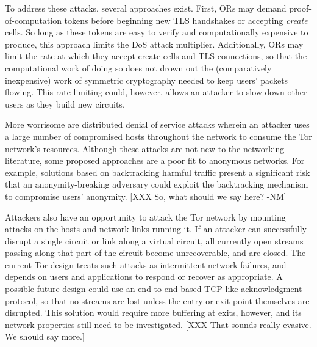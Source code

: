 \documentclass[times,10pt,twocolumn]{article}
\begin{document}
To address these attacks, several approaches exist.  First, ORs may
demand proof-of-computation tokens \cite{hashcash} before beginning new
TLS handshakes or accepting \emph{create} cells.  So long as these
tokens are easy to verify and computationally expensive to produce, this
approach limits the DoS attack multiplier.  Additionally, ORs may limit
the rate at which they accept create cells and TLS connections, so that
the computational work of doing so does not drown out the (comparatively
inexpensive) work of symmetric cryptography needed to keep users'
packets flowing.  This rate limiting could, however, allows an attacker
to slow down other users as they build new circuits.


More worrisome are distributed denial of service attacks wherein an
attacker uses a large number of compromised hosts throughout the network
to consume the Tor network's resources.  Although these attacks are not
new to the networking literature, some proposed approaches are a poor
fit to anonymous networks.  For example, solutions based on backtracking
harmful traffic present a significant risk that an anonymity-breaking
adversary could exploit the backtracking mechanism to compromise users'
anonymity.  [XXX So, what should we say here? -NM]


Attackers also have an opportunity to attack the Tor network by mounting
attacks on the hosts and network links running it. If an attacker can
successfully disrupt a single circuit or link along a virtual circuit,
all currently open streams passing along that part of the circuit
become unrecoverable, and are closed.  The current Tor design treats
such attacks as intermittent network failures, and depends on users and
applications to respond or recover as appropriate.  A possible future
design could use an end-to-end based TCP-like acknowledgment protocol,
so that no streams are lost unless the entry or exit point themselves
are disrupted.  This solution would require more buffering at exits,
however, and its network properties still need to be investigated. [XXX
  That sounds really evasive. We should say more.]

\end{document}
